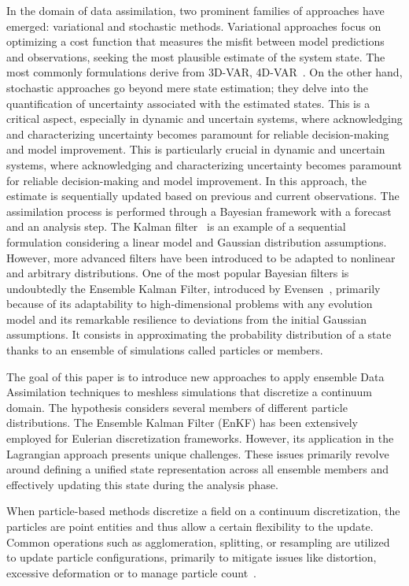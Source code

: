 In the domain of data assimilation, two prominent families of approaches have emerged: variational and stochastic methods. Variational approaches \cite{variational_method} focus on optimizing a cost function that measures the misfit between model predictions and observations, seeking the most plausible estimate of the system state. The most commonly formulations derive from 3D-VAR, 4D-VAR~\cite{talagrand1997assimilation}. On the other hand, stochastic approaches go beyond mere state estimation; they delve into the quantification of uncertainty associated with the estimated states. This is a critical aspect, especially in dynamic and uncertain systems, where acknowledging and characterizing uncertainty becomes paramount for reliable decision-making and model improvement. This is particularly crucial in dynamic and uncertain systems, where acknowledging and characterizing uncertainty becomes paramount for reliable decision-making and model improvement. In this approach, the estimate is sequentially updated based on previous and current observations. The assimilation process is performed through a Bayesian framework with a forecast and an analysis step. The Kalman filter~\cite{kalman_new_1960} is an example of a sequential formulation considering a linear model and Gaussian distribution assumptions. However, more advanced filters have been introduced to be adapted to nonlinear and arbitrary distributions. One of the most popular Bayesian filters is undoubtedly the Ensemble Kalman Filter, introduced by Evensen~\cite{evensen_sequential_1994}, primarily because of its adaptability to high-dimensional problems with any evolution model and its remarkable resilience to deviations from the initial Gaussian assumptions. It consists in approximating the probability distribution of a state thanks to an ensemble of simulations called particles or members. \newline

The goal of this paper is to introduce new approaches to apply ensemble Data Assimilation techniques to meshless simulations that discretize a continuum domain. The hypothesis considers several members of different particle distributions. The Ensemble Kalman Filter (EnKF) has been extensively employed for Eulerian discretization frameworks. However, its application in the Lagrangian approach presents unique challenges. These issues primarily revolve around defining a unified state representation across all ensemble members and effectively updating this state during the analysis phase.

When particle-based methods discretize a field on a continuum discretization, the particles are point entities and thus allow a certain flexibility to the update. Common operations such as agglomeration, splitting, or resampling are utilized to update particle configurations, primarily to mitigate issues like distortion, excessive deformation or to manage particle count~\cite{yue_continuum_2015,cottet_multi-purpose_1999}.

